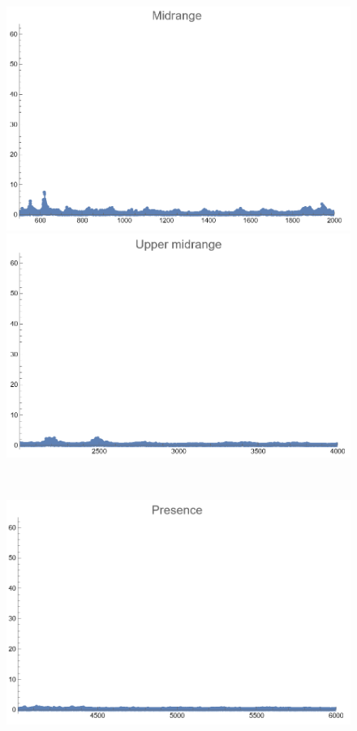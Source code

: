 \documentclass[12pt, letterpaper]{article}
\begin{document}
\begin{figure}[H]
\begin{minipage}{.3\textwidth}
  \end{minipage}
  \begin{minipage}{0.03\textwidth}\end{minipage}
  \begin{minipage}{.3\textwidth}
    \centering
    \includegraphics[width=.9\linewidth]{imgs/Cancion9/mid.png}
  \end{minipage}
  \begin{minipage}{0.03\textwidth}\end{minipage}
  \begin{minipage}{.3\textwidth}
    \centering
    \includegraphics[width=.9\linewidth]{imgs/Cancion9/upmid.png}
  \end{minipage} \medskip \\
  \begin{minipage}{.3\textwidth}
    \centering
    \includegraphics[width=.9\linewidth]{imgs/Cancion9/presence.png}

\end{minipage}
\end{figure}
\end{document}
